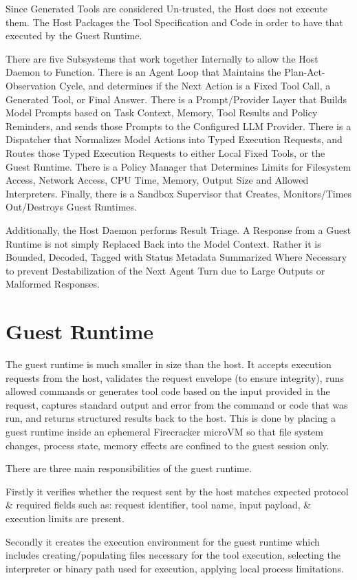 Since Generated Tools are considered Un-trusted, the Host does not execute them. The Host Packages the Tool Specification and Code in order to have that executed by the Guest Runtime.

There are five Subsystems that work together Internally to allow the Host Daemon to Function. There is an Agent Loop that Maintains the Plan-Act-Observation Cycle, and determines if the Next Action is a Fixed Tool Call, a Generated Tool, or Final Answer. There is a Prompt/Provider Layer that Builds Model Prompts based on Task Context, Memory, Tool Results and Policy Reminders, and sends those Prompts to the Configured LLM Provider. There is a Dispatcher that Normalizes Model Actions into Typed Execution Requests, and Routes those Typed Execution Requests to either Local Fixed Tools, or the Guest Runtime. There is a Policy Manager that Determines Limits for Filesystem Access, Network Access, CPU Time, Memory, Output Size and Allowed Interpreters. Finally, there is a Sandbox Supervisor that Creates, Monitors/Times Out/Destroys Guest Runtimes.

Additionally, the Host Daemon performs Result Triage. A Response from a Guest Runtime is not simply Replaced Back into the Model Context. Rather it is Bounded, Decoded, Tagged with Status Metadata Summarized Where Necessary to prevent Destabilization of the Next Agent Turn due to Large Outputs or Malformed Responses.

\section{Guest Runtime}
The guest runtime is much smaller in size than the host. It accepts execution requests from the host, validates the request envelope (to ensure integrity), runs allowed commands or generates tool code based on the input provided in the request, captures standard output and error from the command or code that was run, and returns structured results back to the host.
This is done by placing a guest runtime inside an ephemeral Firecracker microVM so that file system changes, process state, memory effects are confined to the guest session only.

There are three main responsibilities of the guest runtime.

Firstly it verifies whether the request sent by the host matches expected protocol & required fields such as: request identifier, tool name, input payload, & execution limits are present.

Secondly it creates the execution environment for the guest runtime which includes creating/populating files necessary for the tool execution, selecting the interpreter or binary path used for execution, applying local process limitations.

